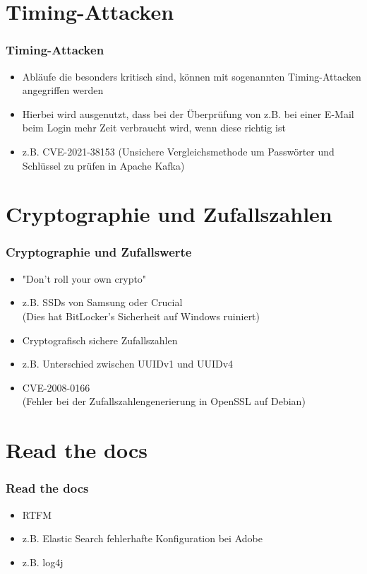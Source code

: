 \documentclass[ngerman2]{beamer}
\begin{document}
\section{Timing-Attacken}

\begin{frame}[fragile]
\frametitle{Timing-Attacken}
  \begin{itemize}
		\item Abläufe die besonders kritisch sind, können mit sogenannten Timing-Attacken angegriffen werden
    \item Hierbei wird ausgenutzt, dass bei der Überprüfung von z.B. bei einer
      E-Mail beim Login mehr Zeit verbraucht wird, wenn diese richtig ist
    \item z.B. CVE-2021-38153
      (Unsichere Vergleichsmethode um Passwörter und Schlüssel zu prüfen in Apache Kafka)
      \cite{CVE202138153}
  \end{itemize}
\end{frame}

\section{Cryptographie und Zufallszahlen}

\begin{frame}[fragile]
\frametitle{Cryptographie und Zufallswerte}
  \begin{itemize}
    \item "Don't roll your own crypto"
    \item z.B. SSDs von Samsung oder Crucial \cite{ssdscrypt}\\
      (Dies hat BitLocker's Sicherheit auf Windows ruiniert)
      \cite{bitlockermssoftware}
    \item Cryptografisch sichere Zufallszahlen
    \item z.B. Unterschied zwischen UUIDv1 und UUIDv4 \cite{uuid}
    \item CVE-2008-0166\\
      (Fehler bei der Zufallszahlengenerierung in OpenSSL auf Debian)
      \cite{debiansslcve}
      \cite{debiansslcvenist}
  \end{itemize}
\end{frame}

\section{Read the docs}

\begin{frame}[fragile]
\frametitle{Read the docs}
  \begin{itemize}
		\item RTFM
    \item z.B. Elastic Search fehlerhafte Konfiguration bei Adobe
      \cite{adobeelasticsearch}
    \item z.B. log4j
      \cite{CVE202144228}
  \end{itemize}
\end{frame}
\end{document}
